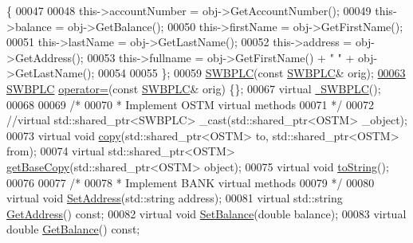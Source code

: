 \begin{DoxyCode}
      \{
00047 
00048         this->accountNumber = obj->GetAccountNumber();
00049         this->balance = obj->GetBalance();
00050         this->firstName = obj->GetFirstName();
00051         this->lastName = obj->GetLastName();
00052         this->address = obj->GetAddress();
00053         this->fullname = obj->GetFirstName() + \textcolor{stringliteral}{" "} + obj->GetLastName();
00054         
00055     \};
00059     \hyperlink{class_s_w_b_p_l_c_a320f4e2b023038668d941ce5d0c46aeb}{SWBPLC}(\textcolor{keyword}{const} \hyperlink{class_s_w_b_p_l_c}{SWBPLC}& orig);
\hypertarget{_s_w_b_p_l_c_8h_source.tex_l00063}{}\hyperlink{class_s_w_b_p_l_c_a1e4b8f85d4e8e29429d691e258fea2e7}{00063}     \hyperlink{class_s_w_b_p_l_c}{SWBPLC} \hyperlink{class_s_w_b_p_l_c_a1e4b8f85d4e8e29429d691e258fea2e7}{operator=}(\textcolor{keyword}{const} \hyperlink{class_s_w_b_p_l_c}{SWBPLC}& orig) \{\};
00067     \textcolor{keyword}{virtual} \hyperlink{class_s_w_b_p_l_c_a5d6f00a76145f32424ff6db9ac23c6fe}{~SWBPLC}();
00068     
00069     \textcolor{comment}{/*}
00070 \textcolor{comment}{     * Implement OSTM virtual methods}
00071 \textcolor{comment}{     */}
00072     \textcolor{comment}{//virtual std::shared\_ptr<SWBPLC> \_cast(std::shared\_ptr<OSTM> \_object);}
00073     \textcolor{keyword}{virtual} \textcolor{keywordtype}{void} \hyperlink{class_s_w_b_p_l_c_a9468640482a6cfb9bfb4115fc59191d5}{copy}(std::shared\_ptr<OSTM> to, std::shared\_ptr<OSTM> from);
00074     \textcolor{keyword}{virtual} std::shared\_ptr<OSTM> \hyperlink{class_s_w_b_p_l_c_a77f0e0d6c08a95066d277bf6b2073a5c}{getBaseCopy}(std::shared\_ptr<OSTM> \textcolor{keywordtype}{object});
00075     \textcolor{keyword}{virtual} \textcolor{keywordtype}{void} \hyperlink{class_s_w_b_p_l_c_a761c77b5a204b4ae05ffb01bd602c3c2}{toString}();
00076     
00077     \textcolor{comment}{/*}
00078 \textcolor{comment}{     * Implement BANK virtual methods}
00079 \textcolor{comment}{     */}
00080     \textcolor{keyword}{virtual} \textcolor{keywordtype}{void} \hyperlink{class_s_w_b_p_l_c_a99590e47dda8361b2d5869fd315f92f8}{SetAddress}(std::string address);
00081     \textcolor{keyword}{virtual} std::string \hyperlink{class_s_w_b_p_l_c_a3a62a57b3ecdd06ed977ef372dab89ad}{GetAddress}() \textcolor{keyword}{const};
00082     \textcolor{keyword}{virtual} \textcolor{keywordtype}{void} \hyperlink{class_s_w_b_p_l_c_a9a0d94da8922f00ca4a3e5fa774e8b3f}{SetBalance}(\textcolor{keywordtype}{double} balance);
00083     \textcolor{keyword}{virtual} \textcolor{keywordtype}{double} \hyperlink{class_s_w_b_p_l_c_af7f5f662ab926bfb9c0c1c7156cde24c}{GetBalance}() \textcolor{keyword}{const};

\end{DoxyCode}
